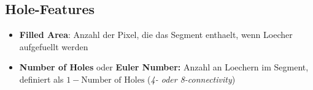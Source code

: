 \subsection{Hole-Features}

\begin{itemize}
  \item \textbf{Filled Area}: Anzahl der Pixel, die das Segment enthaelt, wenn Loecher aufgefuellt werden
  \item \textbf{Number of Holes} oder \textbf{Euler Number:} Anzahl an Loechern im Segment, definiert als $1 - \text{Number of Holes}$ (\emph{4- oder 8-connectivity})
\end{itemize}
